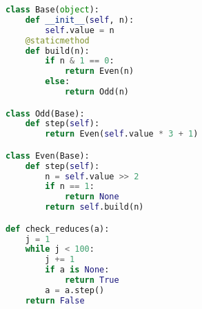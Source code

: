\begin{lstlisting}[language=Python, numbers=right]
class Base(object):
    def __init__(self, n):
        self.value = n
    @staticmethod
    def build(n):
        if n & 1 == 0:
            return Even(n)
        else:
            return Odd(n)

class Odd(Base):
    def step(self):
        return Even(self.value * 3 + 1)

class Even(Base):
    def step(self):
        n = self.value >> 2
        if n == 1:
            return None
        return self.build(n)

def check_reduces(a):
    j = 1
    while j < 100:
        j += 1
        if a is None:
            return True
        a = a.step()
    return False
\end{lstlisting}
